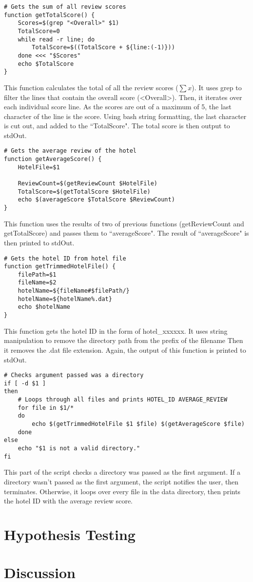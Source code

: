 \documentclass[a4paper]{article}
\begin{document}
\begin{lstlisting}
# Gets the sum of all review scores
function getTotalScore() {
	Scores=$(grep "<Overall>" $1)
	TotalScore=0
	while read -r line; do
		TotalScore=$((TotalScore + ${line:(-1)}))
	done <<< "$Scores"
	echo $TotalScore
}
\end{lstlisting}
This function calculates the total of all the review scores ($\sum x$).
It uses grep to filter the lines that contain the overall score (\textless Overall\textgreater).
Then, it iterates over each individual score line.
As the scores are out of a maximum of 5, the last character of the line is the score.
Using bash string formatting, the last character is cut out, and added to the ``TotalScore".
The total score is then output to stdOut.

\begin{lstlisting}
# Gets the average review of the hotel
function getAverageScore() {
	HotelFile=$1
	
	ReviewCount=$(getReviewCount $HotelFile)
	TotalScore=$(getTotalScore $HotelFile)
	echo $(averageScore $TotalScore $ReviewCount)
}
\end{lstlisting}
This function uses the results of two of previous functions (getReviewCount and getTotalScore) and passes them to ``averageScore".
The result of ``averageScore" is then printed to stdOut.

\begin{lstlisting}
# Gets the hotel ID from hotel file
function getTrimmedHotelFile() {
	filePath=$1
	fileName=$2
	hotelName=${fileName#$filePath/}
	hotelName=${hotelName%.dat}
	echo $hotelName
}
\end{lstlisting}
This function gets the hotel ID in the form of hotel\_xxxxxx.
It uses string manipulation to remove the directory path from the prefix of the filename
Then it removes the .dat file extension.
Again, the output of this function is printed to stdOut.

\begin{lstlisting}
# Checks argument passed was a directory
if [ -d $1 ]
then
	# Loops through all files and prints HOTEL_ID AVERAGE_REVIEW
	for file in $1/*
	do
		echo $(getTrimmedHotelFile $1 $file) $(getAverageScore $file)
	done
else
	echo "$1 is not a valid directory."
fi
\end{lstlisting}
This part of the script checks a directory was passed as the first argument.
If a directory wasn't passed as the first argument, the script notifies the user, then terminates.
Otherwise, it loops over every file in the data directory, then prints the hotel ID with the average review score.


\newpage
\section{Hypothesis Testing}

\newpage
\section{Discussion}
\end{document}
